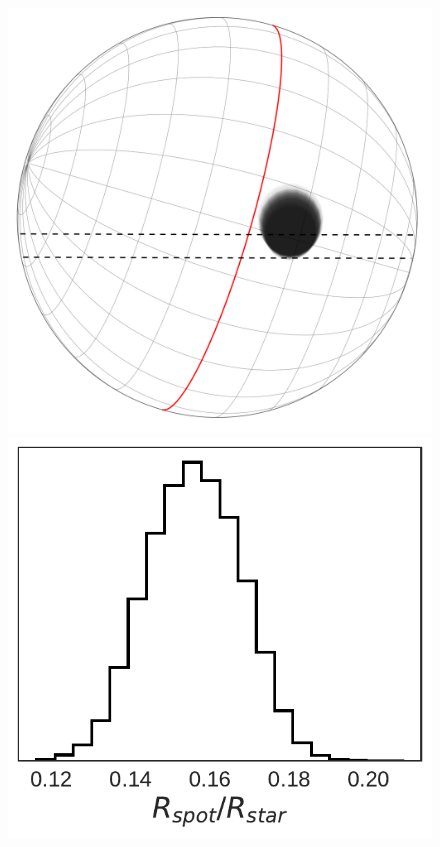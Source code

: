 \begin{figure}
\centering
\includegraphics[scale=0.18]{stsp_hat_p_11/transit071.pdf}
\includegraphics[scale=0.35]{stsp_hat_p_11/rad_071.pdf}

\end{figure}
